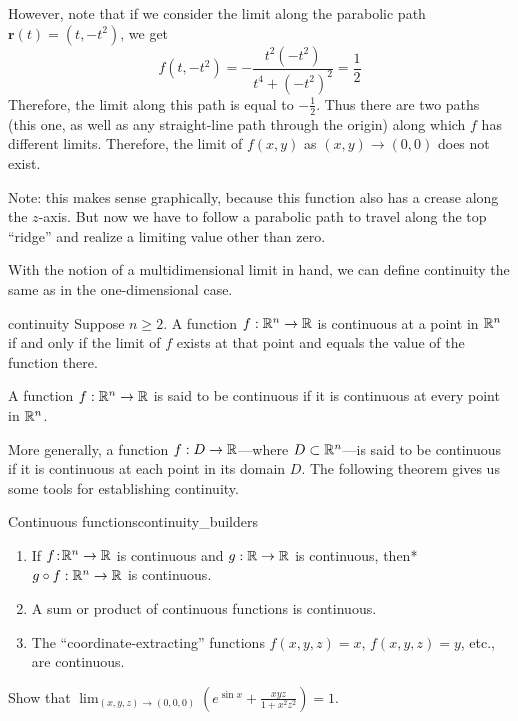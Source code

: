 \documentclass{watsonbook}
\begin{document}
\begin{solution}
  However, note that if we consider the limit along the parabolic
  path $\mathbf{r}(t) = (t, -t^2)$, we get
  \[
    f(t,-t^2) = -\frac{t^2(-t^2)}{t^4+(-t^2)^2} = \frac{1}{2}
  \]
  Therefore, the limit along this path is equal to
  $-\tfrac{1}{2}$. Thus there are two paths (this one, as well as
  any straight-line path through the origin) along which $f$ has
  different limits. Therefore, the limit of $f(x,y)$ as $(x,y) \to
  (0,0)$ does not exist.
  
  Note: this makes sense graphically, because this function also has a
  crease along the $z$-axis. But now we have to follow a
  parabolic path to travel along the top ``ridge'' and realize a
  limiting value other than zero.
\end{solution}

With the notion of a multidimensional limit in hand, we can define
continuity the same as in the one-dimensional case. 

\begin{defn}{}{continuity}
  Suppose $n \geq 2$. A function $f: \mathbb{R}^n \to \mathbb{R}$ is continuous at a
  point in $\mathbb{R}^n$ if and only if the limit of $f$ exists at that point
  and equals the value of the function there.

  A function $f: \mathbb{R}^n \to \mathbb{R}$ is said to be continuous if it is
  continuous at every point in $\mathbb{R}^n$. 
\end{defn}

More generally, a function $f:D \to \mathbb{R}$---where $D \subset \mathbb{R}^n$---is
said to be continuous if it is continuous at each point in its
domain $D$. The following theorem gives us some tools for establishing
continuity. 

\begin{theo}{Continuous functions}{continuity_builders}
  \begin{enumerate}[leftmargin = 12pt]
    \item If $f  \!:\! \mathbb{R}^n \to \mathbb{R}$ is continuous and $g: \mathbb{R} \to \mathbb{R}$
    is continuous, then* $g\circ f :\mathbb{R}^n \to \mathbb{R}$ is
    continuous. 
  \item A sum or product of continuous functions is continuous. 
  \item The ``coordinate-extracting'' functions $f(x,y,z) = x$, $f(x,y,z) = y$, etc., are
    continuous.
  \end{enumerate}
\end{theo}

\begin{example}{}{}
  Show that $\displaystyle{\lim_{(x,y,z) \to (0,0,0)}\left(e^{\sin x} + \frac{xyz}{1 + x^2
    z^2}\right)} = 1$. 
\end{example}
\end{document}
